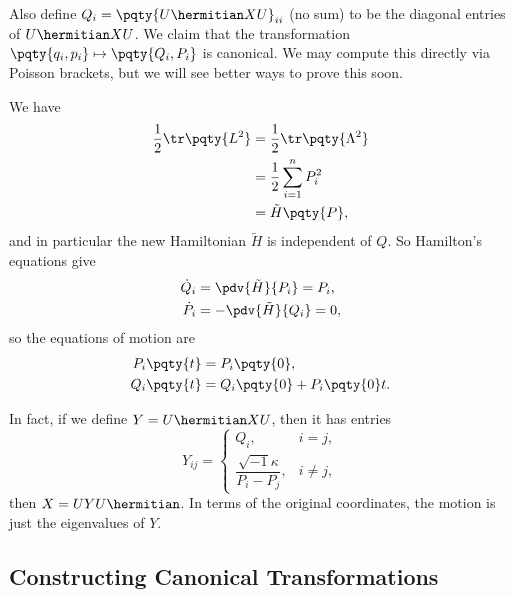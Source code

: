 \begin{example}
    Also define \(Q_i = \pqty{U\hermitian X U}_{ii}\) (no sum) to be the diagonal entries of \(U\hermitian X U\). We claim that the transformation \(\pqty{q_i, p_i} \mapsto \pqty{Q_i, P_i}\) is canonical. We may compute this directly via Poisson brackets, but we will see better ways to prove this soon.

    We have
    \begin{subequations}
        \begin{align}
            \frac{1}{2} \tr \pqty{L^2} &= \frac{1}{2} \tr \pqty{\Lambda^2} \\
            &= \frac{1}{2} \sum_{i = 1}^{n} P_i^2 \\
            &= \tilde{H}\pqty{P},
        \end{align}
    \end{subequations}
    and in particular the new Hamiltonian \(\tilde{H}\) is independent of \(Q\). So Hamilton's equations give
    \begin{subequations}
        \begin{align}
            \dot{Q}_i &= \pdv{\tilde{H}}{P_i} = P_i, \\
            \dot{P}_i &= - \pdv{\tilde{H}}{Q_i} = 0,
        \end{align}
    \end{subequations}
    so the equations of motion are
    \begin{subequations}
        \begin{align}
            P_i\pqty{t} &= P_i\pqty{0}, \\
            Q_i\pqty{t} &= Q_i\pqty{0} + P_i\pqty{0} t.
        \end{align}
    \end{subequations}

    In fact, if we define \(Y = U\hermitian X U\), then it has entries
    \begin{equation}
        Y_{ij} = \begin{cases}
            Q_i, & i = j, \\
            \dfrac{\sqrt{-1} \kappa}{P_i - P_j}, & i \neq j,
        \end{cases}
    \end{equation}
    then \(X = U Y U\hermitian\). In terms of the original coordinates, the motion is just the eigenvalues of \(Y\). 
\end{example}

\subsection{Constructing Canonical Transformations}

